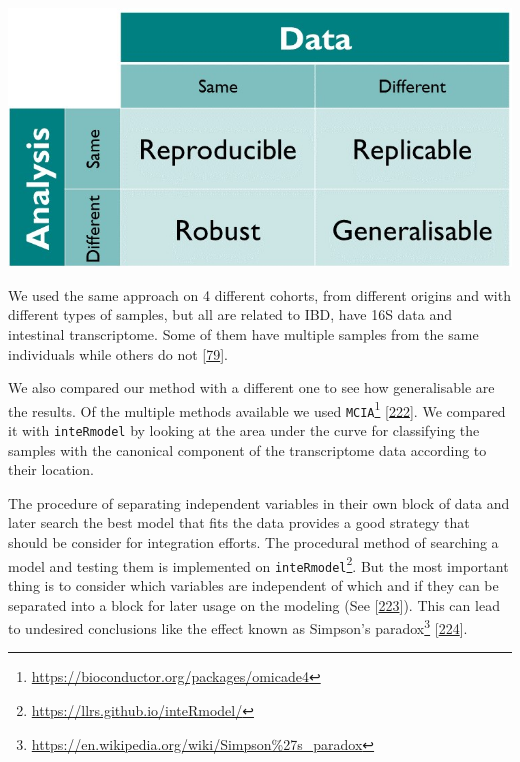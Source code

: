 \documentclass[
  a4paper,
]{book}
\DeclareRobustCommand{\href}[2]{#2\footnote{\url{#1}}}
\let\origfigure\figure
\let\endorigfigure\endfigure
\renewenvironment{figure}[1][2] {
    \expandafter\origfigure\expandafter[!ht]
} {
    \endorigfigure
}
\begin{document}
\begin{figure}
\includegraphics[width=1\linewidth]{images/turing_way_reproducible-matrix} \caption[Reproducibility matrix]{Reproducibility matrix indicating the terminology used between using the same method and the same data. Figure from The Turing Way: A Handbook for Reproducible Data Science (Version v1.0.1).}\label{fig:reproducible-matrix}
\end{figure}

We used the same approach on 4 different cohorts, from different origins and with different types of samples, but all are related to IBD, have 16S data and intestinal transcriptome.
Some of them have multiple samples from the same individuals while others do not {[}\protect\hyperlink{ref-hasler_uncoupling_2016}{79}{]}.

We also compared our method with a different one to see how generalisable are the results.
Of the multiple methods available we used \href{https://bioconductor.org/packages/omicade4}{\texttt{MCIA}} {[}\protect\hyperlink{ref-mengMultivariateApproachIntegration2014}{222}{]}.
We compared it with \texttt{inteRmodel} by looking at the area under the curve for classifying the samples with the canonical component of the transcriptome data according to their location.

The procedure of separating independent variables in their own block of data and later search the best model that fits the data provides a good strategy that should be consider for integration efforts.
The procedural method of searching a model and testing them is implemented on \href{https://llrs.github.io/inteRmodel/}{\texttt{inteRmodel}}.
But the most important thing is to consider which variables are independent of which and if they can be separated into a block for later usage on the modeling (See {[}\protect\hyperlink{ref-pearl2011}{223}{]}).
This can lead to undesired conclusions like the effect known as \href{https://en.wikipedia.org/wiki/Simpson\%27s_paradox}{Simpson's paradox} {[}\protect\hyperlink{ref-simpson1951}{224}{]}.
\end{document}
